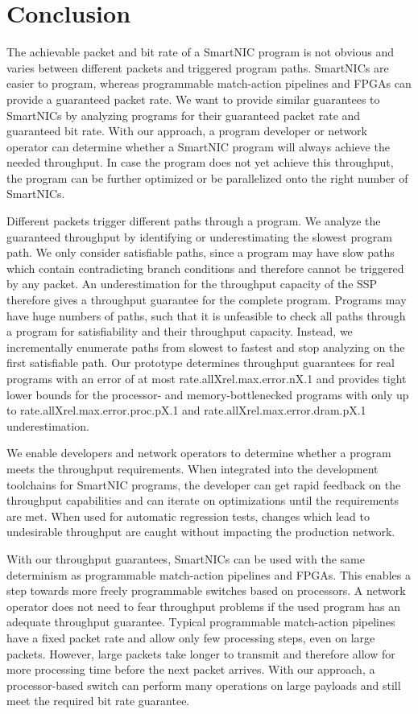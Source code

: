 \documentclass[10pt,letterpaper,sigconf,anonymous,nonacm,screen]{acmart}
\newcommand{\mdata}[3]{%
	\csname #1X#2X#3\endcsname%
}
\begin{document}
\section{Conclusion}
\label{sec:conclusion}

The achievable packet and bit rate of a SmartNIC program is not obvious and varies between different packets and triggered program paths.
SmartNICs are easier to program, whereas programmable match-action pipelines and FPGAs can provide a guaranteed packet rate.
We want to provide similar guarantees to SmartNICs by analyzing programs for their guaranteed packet rate and guaranteed bit rate.
With our approach, a program developer or network operator can determine whether a SmartNIC program will always achieve the needed throughput.
In case the program does not yet achieve this throughput, the program can be further optimized or be parallelized onto the right number of SmartNICs.

Different packets trigger different paths through a program.
We analyze the guaranteed throughput by identifying or underestimating the slowest program path.
We only consider satisfiable paths, since a program may have slow paths which contain contradicting branch conditions and therefore cannot be triggered by any packet.
An underestimation for the throughput capacity of the \acl{SSP} therefore gives a throughput guarantee for the complete program.
Programs may have huge numbers of paths, such that it is unfeasible to check all paths through a program for satisfiability and their throughput capacity.
Instead, we incrementally enumerate paths from slowest to fastest and stop analyzing on the first satisfiable path.
Our prototype determines throughput guarantees for real programs with an error of at most  \mdata{rate.all}{rel.max.error.n}{.1} and provides tight lower bounds for the processor- and memory-bottlenecked programs with only up to \mdata{rate.all}{rel.max.error.proc.p}{.1} and \mdata{rate.all}{rel.max.error.dram.p}{.1} underestimation.

We enable developers and network operators to determine whether a program meets the throughput requirements.
When integrated into the development toolchains for SmartNIC programs, the developer can get rapid feedback on the throughput capabilities and can iterate on optimizations until the requirements are met.
When used for automatic regression tests, changes which lead to undesirable throughput are caught without impacting the production network.

With our throughput guarantees, SmartNICs can be used with the same determinism as programmable match-action pipelines and FPGAs.
This enables a step towards more freely programmable switches based on processors.
A network operator does not need to fear throughput problems if the used program has an adequate throughput guarantee.
Typical programmable match-action pipelines have a fixed packet rate and allow only few processing steps, even on large packets.
However, large packets take longer to transmit and therefore allow for more processing time before the next packet arrives.
With our approach, a processor-based switch can perform many operations on large payloads and still meet the required bit rate guarantee.
\end{document}
